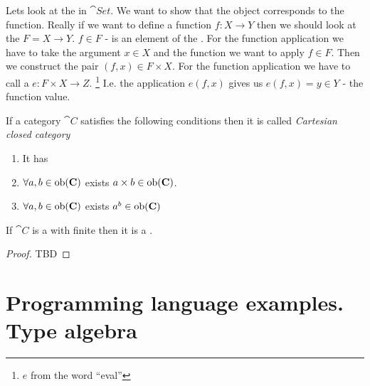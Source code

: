 \begin{example}
\label{ex:exponential_set}
Lets look at the  in $\cat{Set}$. We want
to show that the object corresponds to the function. Really if we want
to define a function $f: X \to Y$ then we should look at the
 $F = X \to Y$. $f \in F$ - is an element of the
. For the function application we have to take the argument $x
\in X$ and the function we want to apply $f \in F$. Then we construct
the pair $(f,x) \in F \times X$. For the function application we have
to call a  $e: F \times X \to Z$.
\footnote{$e$ from the word ``eval''}
I.e. the
application $e(f, x)$ gives us $e(f, x) = y \in Y$ - the function
value. 
\end{example}

\begin{definition}
\label{def:cartesian_closed_category}
If a category $\cat{C}$ satisfies the following conditions then it is
called \textit{Cartesian closed category}
\begin{enumerate}
\item It has 
\item $\forall a,b \in \mathrm{ob}(\mathbf{C})$ exists  $a
  \times b \in \mathrm{ob}(\mathbf{C})$.
\item $\forall a,b \in \mathrm{ob}(\mathbf{C})$ exists 
  $a^b \in \mathrm{ob}(\mathbf{C})$
\end{enumerate}
\end{definition}

\begin{theorem}
\label{thm:ccc}
If $\cat{C}$ is a  with
finite  then it is a
.
\begin{proof}
TBD
\end{proof}
\end{theorem}

\section{Programming language examples. Type algebra}


